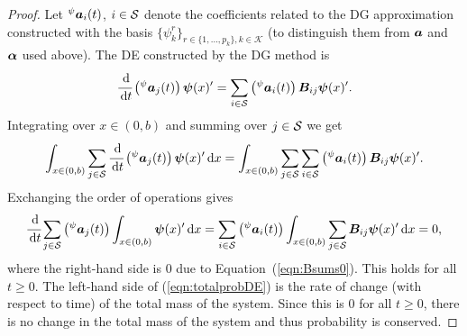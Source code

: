 \begin{proof}
Let \( {}^\psi \boldsymbol a_i(t)\), \(i\in\mathcal{S}\) denote the coefficients related to the DG approximation constructed with the basis \(\{\psi^r_k\}_{r\in\{1,...,p_k\},k\in\mathcal K}\) (to distinguish them from \(\boldsymbol a\) and \(\boldsymbol \alpha\) used above). The DE constructed by the DG method is
\begin{align*}
	\cfrac{\, \mathrm{d}}{\, \mathrm{d} t}\left({}^\psi \boldsymbol a_j (t)\right)\boldsymbol \psi(x)'{} = \sum_{i\in\mathcal{S}}\left({}^\psi \boldsymbol a_i (t)\right)\boldsymbol B_{ij}\boldsymbol\psi(x)'{}.
\end{align*}
Integrating over \(x\in (0,b)\) and summing over \(j\in\mathcal{S}\) we get
\begin{align*}
	\int_{x\in(0,b)}\sum_{j\in\mathcal{S}}\cfrac{\, \mathrm{d}}{\, \mathrm{d} t}\left({}^\psi \boldsymbol a_j (t)\right)\boldsymbol \psi(x)'{}\, \mathrm{d} x = \int_{x\in(0,b)}\sum_{j\in\mathcal{S}}\sum_{i\in\mathcal{S}}\left({}^\psi \boldsymbol a_i (t)\right)\boldsymbol B_{ij}\boldsymbol\psi(x)'{}.
\end{align*}
Exchanging the order of operations gives 
\begin{align}\label{eqn:totalprobDE}
	\cfrac{\, \mathrm{d}}{\, \mathrm{d} t}\sum_{j\in\mathcal{S}} \left({}^\psi \boldsymbol a_j (t)\right)\int_{x\in(0,b)} \boldsymbol \psi(x)'{}\, \mathrm{d} x =  \sum_{i\in\mathcal{S}}\left({}^\psi \boldsymbol a_i (t)\right)\int_{x\in(0,b)}\sum_{j\in\mathcal{S}}\boldsymbol B_{ij}\boldsymbol\psi(x)'{}\, \mathrm{d} x = 0,
\end{align}
where the right-hand side is \(0\) due to Equation~(\ref{eqn:Bsums0}). This holds for all \(t\geq 0\). The left-hand side of (\ref{eqn:totalprobDE}) is the rate of change (with respect to time) of the total mass of the system. Since this is \( 0\) for all \(t\geq 0\), there is no change in the total mass of the system and thus probability is conserved. 
\end{proof}
